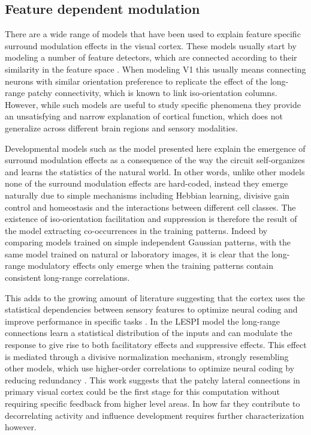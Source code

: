 \subsection{Feature dependent modulation}

There are a wide range of models that have been used to explain
feature specific surround modulation effects in the visual
cortex. These models usually start by modeling a number of feature
detectors, which are connected according to their similarity in the
feature space \citep{Li2002, Schwabe2006}. When modeling V1 this
usually means connecting neurons with similar orientation preference
to replicate the effect of the long-range patchy connectivity, which
is known to link iso-orientation columns. However, while such models
are useful to study specific phenomena they provide an unsatisfying
and narrow explanation of cortical function, which does not generalize
across different brain regions and sensory modalities.

Developmental models such as the model presented here explain the
emergence of surround modulation effects as a consequence of the way
the circuit self-organizes and learns the statistics of the natural
world. In other words, unlike other models none of the surround
modulation effects are hard-coded, instead they emerge naturally due
to simple mechanisms including Hebbian learning, divisive gain control
and homeostasis and the interactions between different cell
classes. The existence of iso-orientation facilitation and suppression
is therefore the result of the model extracting co-occurrences in the
training patterns. Indeed by comparing models trained on simple
independent Gaussian patterns, with the same model trained on natural
or laboratory images, it is clear that the long-range modulatory
effects only emerge when the training patterns contain consistent
long-range correlations.

This adds to the growing amount of literature suggesting that the
cortex uses the statistical dependencies between sensory features to
optimize neural coding \citep{Vinje2000, Simoncelli2001} and improve
performance in specific tasks \citep{Geisler2001}. In the LESPI model
the long-range connections learn a statistical distribution of the
inputs and can modulate the response to give rise to both facilitatory
effects and suppressive effects. This effect is mediated through a
divisive normalization mechanism, strongly resembling other models,
which use higher-order correlations to optimize neural coding by
reducing redundancy \citep{Spratling2011, Coen2015}. This work
suggests that the patchy lateral connections in primary visual cortex
could be the first stage for this computation without requiring
specific feedback from higher level areas. In how far they contribute
to decorrelating activity and influence development requires further
characterization however.

